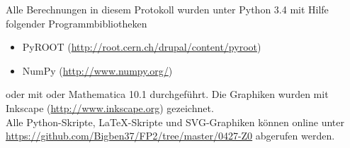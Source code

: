 \documentclass[12pt, a4paper]{scrartcl}
\title{\exptitle}
\subtitle{Fortgeschrittenen-Praktikum 1}
\author{Moritz Bitterling und Benjamin Rottler \\ Universität Freiburg}
\date{\expdate}
\numberwithin{equation}{section} %
\numberwithin{table}{section}    %
\begin{document}
\hypersetup{pageanchor=false} %

\thispagestyle{empty}

\newpage
Alle Berechnungen in diesem Protokoll wurden unter Python 3.4 mit Hilfe folgender Programmbibliotheken
\begin{itemize}
  \item PyROOT (\url{http://root.cern.ch/drupal/content/pyroot})
  \item NumPy (\url{http://www.numpy.org/})
\end{itemize}
oder mit oder Mathematica 10.1 durchgeführt.
Die Graphiken wurden mit Inkscape (\url{http://www.inkscape.org}) gezeichnet.\\[\baselineskip]
Alle Python-Skripte, \LaTeX-Skripte und SVG-Graphiken können online unter \\
\url{https://github.com/Bigben37/FP2/tree/master/0427-Z0} abgerufen werden.
\thispagestyle{empty}

\newpage
\tableofcontents
\thispagestyle{empty}

\newpage
\hypersetup{pageanchor=true} %
\setcounter{page}{1} %

 





\newpage



\appendix

\end{document}
